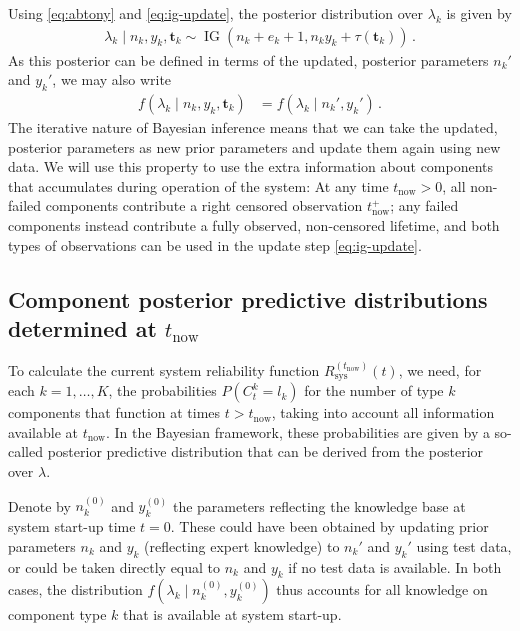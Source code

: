 \documentclass[authoryear]{elsarticle}
\renewcommand{\vec}[1]{{\bm#1}}
\newcommand{\uz}{^{(0)}} %
\newcommand{\ig}{\operatorname{IG}}   %
\def\ykz{y\uz_k}
\def\nkz{n\uz_k}
\newcommand{\nk}{n_k}
\newcommand{\nkp}{n_k'}
\newcommand{\yk}{y_k}
\newcommand{\ykp}{y_k'}
\def\tautk{\tau(\vec{t}_k)}
\def\tnow{t_\text{now}}
\def\tpnow{t^+_\text{now}}
\newcommand{\Rsysnow}{R^{(t_\text{now})}_\text{sys}}
\begin{document}
Using \eqref{eq:abtony} and \eqref{eq:ig-update}, the posterior distribution over $\lambda_k$ is given by
\begin{align}
\lambda_k \mid \nk, \yk, \vec{t}_k \sim \ig(\nk + e_k + 1, \nk \yk + \tautk)\,.
\label{eq:ig-update-alpha}
\end{align}
As this posterior can be defined in terms of
the updated, posterior parameters $\nkp$ and $\ykp$,
we may also write
\begin{align*}
f(\lambda_k \mid \nk, \yk, \vec{t}_k) &= f(\lambda_k \mid \nkp, \ykp)\,.
\end{align*}
The iterative nature of Bayesian inference means that we can take the updated,
posterior parameters as new prior parameters and update them again using new data.
We will use this property to use the extra information about components
that accumulates during operation of the system:
At any time $\tnow > 0$,
all non-failed components contribute a right censored observation $\tpnow$;
any failed components instead contribute a fully observed, non-censored lifetime,
and both types of observations can be used in the update step \eqref{eq:ig-update}.



\subsection{Component posterior predictive distributions determined at $\tnow$}
\label{sec:postpred}

To calculate the current system reliability function $\Rsysnow(t)$,
we need, for each $k=1,\ldots, K$, the probabilities $P(C^k_t = l_k)$
for the number of type $k$ components that function at times $t > \tnow$,
taking into account all information available at $\tnow$.
In the Bayesian framework, these probabilities are given
by a so-called posterior predictive distribution that can be derived from the posterior over $\lambda$.

Denote by $\nkz$ and $\ykz$ the parameters reflecting the knowledge base at system start-up time $t=0$.
These could have been obtained by updating prior parameters $\nk$ and $\yk$ (reflecting expert knowledge)
to $\nkp$ and $\ykp$ using test data,
or could be taken directly equal to $\nk$ and $\yk$ if no test data is available.
In both cases, the distribution $f(\lambda_k \mid \nkz, \ykz)$
thus accounts for all knowledge on component type $k$ that is available at system start-up.
\end{document}
